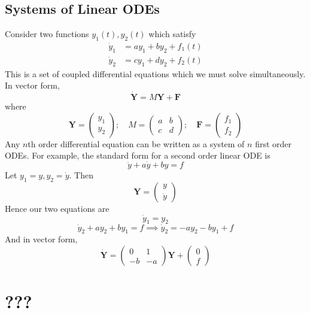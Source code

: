 \documentclass{article}
\begin{document}
	\subsection{Systems of Linear ODEs}
	Consider two functions $y_1(t), y_2(t)$ which satisfy
	\begin{align*}
		\dot y_1 &= ay_1 + by_2 + f_1(t) \\
		\dot y_2 &= cy_1 + dy_2 + f_2(t)
	\end{align*}
	This is a set of coupled differential equations which we must solve simultaneously. In vector form,
	\[ \dot{\bm Y} = M\bm Y + \bm F \]
	where
	\[ \bm Y = \begin{pmatrix}
		y_1 \\ y_2
	\end{pmatrix};\quad M = \begin{pmatrix}
		a & b \\ c & d
	\end{pmatrix};\quad \bm F = \begin{pmatrix}
		f_1 \\ f_2
	\end{pmatrix} \]
	Any $n$th order differential equation can be written as a system of $n$ first order ODEs. For example, the standard form for a second order linear ODE is
	\[ \ddot y + a\dot y + by = f \]
	Let $y_1 = y, y_2 = \dot y$. Then
	\[ \bm Y = \begin{pmatrix}
		y \\ \dot y
	\end{pmatrix} \]
	Hence our two equations are
	\[ \dot y_1 = y_2 \]
	\[ \dot y_2 + ay_2 + by_1 = f \implies \dot y_2 = -ay_2 - by_1 + f \]
	And in vector form,
	\[ \dot{\bm Y} = \begin{pmatrix}
		0 & 1 \\
		-b & -a
	\end{pmatrix} \bm Y + \begin{pmatrix}
		0 \\ f
	\end{pmatrix} \]

	\section{???}
\end{document}
